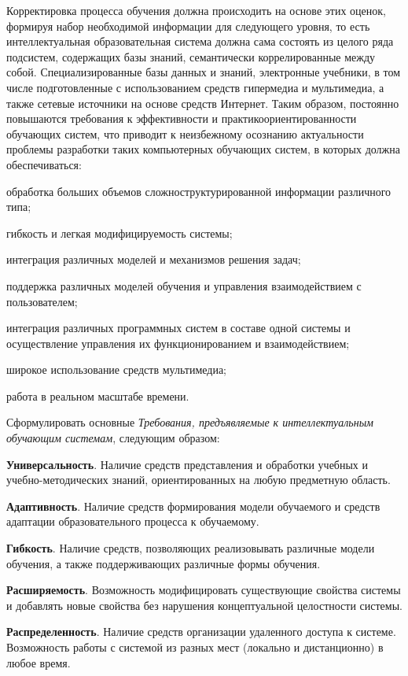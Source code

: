 Корректировка процесса обучения должна происходить на основе этих оценок, формируя набор необходимой информации для следующего уровня, то есть интеллектуальная образовательная система должна сама состоять из целого ряда подсистем, содержащих базы знаний, семантически коррелированные между собой.
Специализированные базы данных и знаний, электронные учебники, в том числе подготовленные с использованием средств гипермедиа и мультимедиа, а также сетевые источники на основе средств Интернет. Таким образом, постоянно повышаются требования к эффективности и практикоориентированности обучающих систем, что приводит к неизбежному осознанию актуальности проблемы разработки таких компьютерных обучающих систем, в которых должна обеспечиваться:
\begin{textitemize}
	\item обработка больших объемов сложноструктурированной информации различного типа;
	\item гибкость и легкая модифицируемость системы;
	\item интеграция различных моделей и механизмов решения задач;
	\item поддержка различных моделей обучения и управления взаимодействием с пользователем;
	\item интеграция различных программных систем в составе одной системы и осуществление управления их функционированием и взаимодействием;
	\item широкое использование средств мультимедиа;
	\item работа в реальном масштабе времени.
\end{textitemize}

Сформулировать основные \textit{Требования, предъявляемые к интеллектуальным обучающим системам}, следующим образом:

\begin{textitemize}
	\item \textbf{Универсальность}. Наличие средств представления и обработки учебных и учебно-методических знаний, ориентированных на любую предметную область.
	\item \textbf{Адаптивность}. Наличие средств формирования модели обучаемого и средств адаптации образовательного процесса к обучаемому.
	\item \textbf{Гибкость}. Наличие средств, позволяющих реализовывать различные модели обучения, а также поддерживающих различные формы обучения.
	\item \textbf{Расширяемость}. Возможность модифицировать существующие свойства системы и добавлять новые свойства без нарушения концептуальной целостности системы.
	\item \textbf{Распределенность}. Наличие средств организации удаленного доступа к системе. Возможность работы с системой из разных мест (локально и дистанционно) в любое время.
\end{textitemize}

